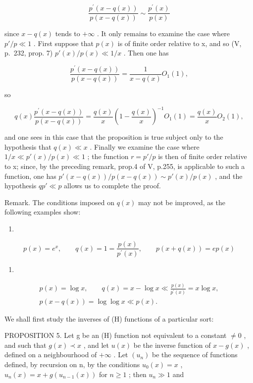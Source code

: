 \[
\frac {p ^ {\prime} (x - q (x))}{p (x - q (x))} \sim \frac {p ^ {\prime} (x)}{p (x)}
\]

since \(x - q(x)\) tends to \(+\infty\) . It only remains to examine the case where \(p' / p \ll 1\) . First suppose that \(p(x)\) is of finite order relative to x, and so (V, p.~232, prop. 7) \(p'(x) / p(x) \ll 1 / x\) . Then one has

\[
\frac {p ^ {\prime} (x - q (x))}{p (x - q (x))} = \frac {1}{x - q (x)} O _ {1} (1),
\]

so

\[
q (x) \frac {p ^ {\prime} (x - q (x))}{p (x - q (x))} = \frac {q (x)}{x} \left(1 - \frac {q (x)}{x}\right) ^ {- 1} O _ {1} (1) = \frac {q (x)}{x} O _ {2} (1),
\]

and one sees in this case that the proposition is true subject only to the hypothesis that \(q(x) \ll x\) . Finally we examine the case where \(1/x \ll p'(x)/p(x) \ll 1\) ; the function \(r = p'/p\) is then of finite order relative to x; since, by the preceding remark, prop.4 of V, p.255, is applicable to such a function, one has \(p'(x-q(x))/p(x-q(x)) \sim p'(x)/p(x)\) , and the hypothesis \(qp' \ll p\) allows us to complete the proof.

Remark. The conditions imposed on \(q(x)\) may not be improved, as the following examples show:

\begin{enumerate}
\def\labelenumi{\alph{enumi})}
\tightlist
\item
\end{enumerate}

\[
p (x) = e ^ {x}, \qquad q (x) = 1 = \frac {p (x)}{p ^ {\prime} (x)}, \qquad p (x + q (x)) = e p (x)
\]

\begin{enumerate}
\def\labelenumi{\alph{enumi})}
\setcounter{enumi}{1}
\tightlist
\item
\end{enumerate}

\[
\begin{array}{c} p (x) = \log x, \qquad q (x) = x - \log x \ll \frac {p (x)}{p ^ {\prime} (x)} = x \log x, \\ p (x - q (x)) = \log \log x \ll p (x). \end{array}
\]

We shall first study the inverses of (H) functions of a particular sort:

PROPOSITION 5. Let g be an (H) function not equivalent to a constant \(\neq 0\) , and such that \(g(x) \prec x\) , and let \(u(x)\) be the inverse function of \(x - g(x)\) , defined on a neighbourhood of \(+\infty\) . Let \((u_n)\) be the sequence of functions defined, by recursion on n, by the conditions \(u_0(x) = x\) , \(u_n(x) = x + g(u_{n-1}(x))\) for \(n \geqslant 1\) ; then \(u_n \gg 1\) and

